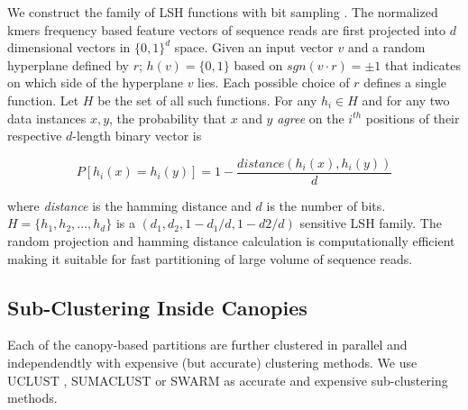 \documentclass[10pt, conference, compsocconf]{IEEEtran}
\begin{document}
We construct the family of 
LSH functions 
with bit sampling \cite{indyk1998approximate}. The normalized kmers frequency based feature vectors of sequence reads 
are first projected into 
$d$ dimensional vectors in $\{0,1\}^d$ space. Given an 
input vector $v$ and a random hyperplane defined by $r$; $h(v)=\{0,1\}$ based on $sgn(v\cdot{r})=\pm{1}$ that indicates on which 
side of the hyperplane $v$ lies. Each possible choice of $r$ defines a single function. Let $H$ be the set of all 
such functions. For any $h_i\in{H}$ and for any two data instances $x,y$, 
the probability that $x$ and $y$ \emph{agree} on the $i^{th}$ positions of their 
respective $d$-length binary vector is

\begin{equation}
P[h_i(x)=h_i(y)]=1-\frac{distance(h_i(x),h_i(y))}{d} 
\end{equation}

where \emph{distance} is the hamming distance and $d$ is the number of bits. $H=\{h_1,h_2,...,h_d\}$ is a $(d_1,d_2,1-d_1/d,1-d2/d)$ sensitive LSH family. The 
random projection and hamming distance calculation is computationally efficient making it 
suitable for fast partitioning of large volume of 
sequence reads. 



\subsection{\textbf{Sub-Clustering Inside Canopies}}
\label{sub-cluster}

Each of the canopy-based 
partitions are 
further clustered in parallel and independendtly 
with  expensive (but accurate)  clustering methods. 
%
We use UCLUST \cite{MARuclust}, SUMACLUST \cite{MARSumaclust} or 
SWARM \cite{MARSwarm2}  as accurate and 
expensive sub-clustering methods. 
\end{document}
